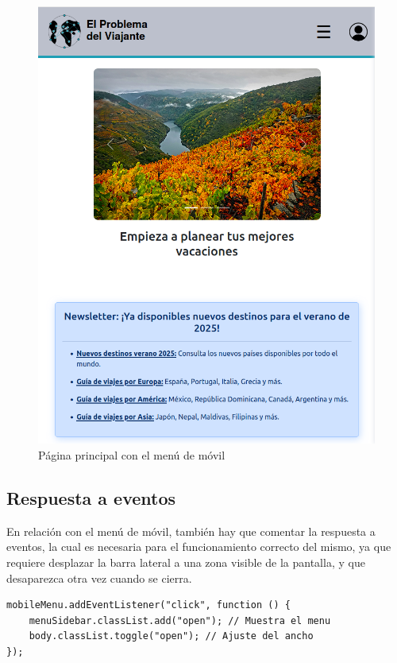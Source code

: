 \documentclass[11pt, a4paper]{book}
\begin{document}
	\begin{figure} [H]
		\centering
		\includegraphics[height=0.4\textheight]{CSS/1-5 768.png}
		\caption{Página principal con el menú de móvil}
	\end{figure}

	\subsection{Respuesta a eventos}

	En relación con el menú de móvil, también hay que comentar la respuesta a eventos, la cual es necesaria para el funcionamiento correcto del mismo, ya que requiere desplazar la barra lateral a una zona visible de la pantalla, y que desaparezca otra vez cuando se cierra.
	
	\begin{lstlisting}
mobileMenu.addEventListener("click", function () {
	menuSidebar.classList.add("open"); // Muestra el menu
	body.classList.toggle("open"); // Ajuste del ancho
});
	\end{lstlisting} 
\end{document}
